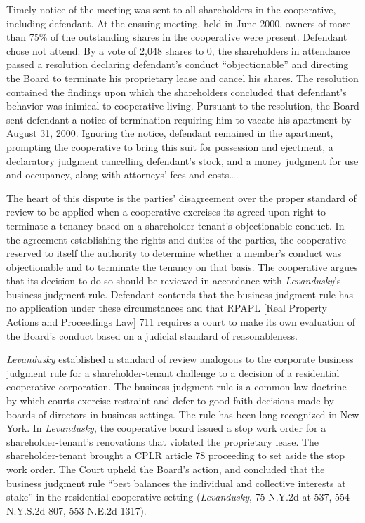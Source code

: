 Timely notice of the meeting was sent to all shareholders in the cooperative,
including defendant. At the ensuing meeting, held in June 2000, owners of more
than 75\% of the outstanding shares in the cooperative were present. Defendant
chose not attend. By a vote of 2,048 shares to 0, the shareholders in attendance
passed a resolution declaring defendant's conduct ``objectionable'' and
directing the Board to terminate his proprietary lease and cancel his shares.
The resolution contained the findings upon which the shareholders concluded that
defendant's behavior was inimical to cooperative living. Pursuant to the
resolution, the Board sent defendant a notice of termination requiring him to
vacate his apartment by August 31, 2000. Ignoring the notice, defendant remained
in the apartment, prompting the cooperative to bring this suit for possession
and ejectment, a declaratory judgment cancelling defendant's stock, and a money
judgment for use and occupancy, along with attorneys' fees and costs\ldots .



The heart of this dispute is the parties' disagreement over the proper standard
of review to be applied when a cooperative exercises its agreed-upon right to
terminate a tenancy based on a shareholder-tenant's objectionable conduct. In
the agreement establishing the rights and duties of the parties, the cooperative
reserved to itself the authority to determine whether a member's conduct was
objectionable and to terminate the tenancy on that basis. The cooperative argues
that its decision to do so should be reviewed in accordance with
\textit{Levandusky}'s business judgment rule. Defendant contends that the
business judgment rule has no application under these circumstances and that
RPAPL [Real Property Actions and Proceedings Law] 711 requires a court to make
its own evaluation of the Board's conduct
based on a judicial standard of reasonableness.

\textit{Levandusky} established a standard of review analogous to the corporate
business judgment rule for a shareholder-tenant challenge to a decision of a
residential cooperative corporation. The business judgment rule is a common-law
doctrine by which courts exercise restraint and defer to good faith decisions
made by boards of directors in business settings. The rule has been long
recognized in New York. In \textit{Levandusky}, the cooperative board issued a
stop work order for a shareholder-tenant's renovations that violated the
proprietary lease. The shareholder-tenant brought a CPLR article 78 proceeding
to set aside the stop work order. The Court upheld the Board's action, and
concluded that the business judgment rule ``best balances the individual and
collective interests at stake'' in the residential cooperative setting
(\textit{Levandusky}, 75 N.Y.2d at 537, 554 N.Y.S.2d 807, 553 N.E.2d 1317).


